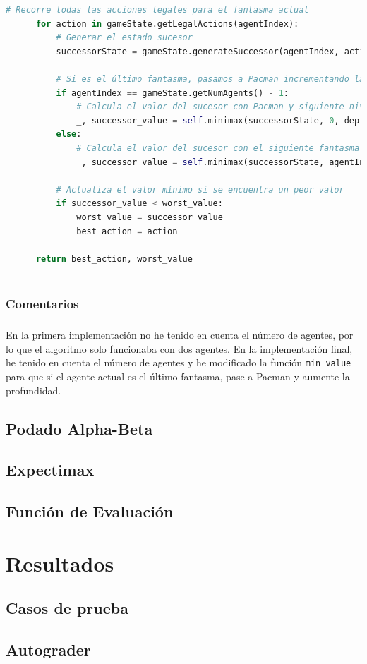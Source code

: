 \documentclass{report}
\begin{document}
\begin{lstlisting}[language=Python, caption=Implementación final del agente Minimax]
      # Recorre todas las acciones legales para el fantasma actual
      for action in gameState.getLegalActions(agentIndex):
          # Generar el estado sucesor
          successorState = gameState.generateSuccessor(agentIndex, action)
          
          # Si es el último fantasma, pasamos a Pacman incrementando la profundidad
          if agentIndex == gameState.getNumAgents() - 1:
              # Calcula el valor del sucesor con Pacman y siguiente nivel de profundidad
              _, successor_value = self.minimax(successorState, 0, depth + 1)
          else:
              # Calcula el valor del sucesor con el siguiente fantasma
              _, successor_value = self.minimax(successorState, agentIndex + 1, depth)

          # Actualiza el valor mínimo si se encuentra un peor valor
          if successor_value < worst_value:
              worst_value = successor_value
              best_action = action

      return best_action, worst_value
        
          \end{lstlisting}
        \subsection{Comentarios}
          \paragraph*{}{
            En la primera implementación no he tenido en cuenta el número de agentes, por lo que el algoritmo solo funcionaba con dos agentes. En la implementación final, he tenido en cuenta el número de agentes y he modificado la función \texttt{min\_value} para que si el agente actual es el último fantasma, pase a Pacman y aumente la profundidad.
          }
      \clearpage\section{Podado Alpha-Beta}
      \clearpage\section{Expectimax}
      \clearpage\section{Función de Evaluación}
    \chapter{Resultados}
      \section{Casos de prueba}
      \clearpage\section{Autograder}
\end{document}
